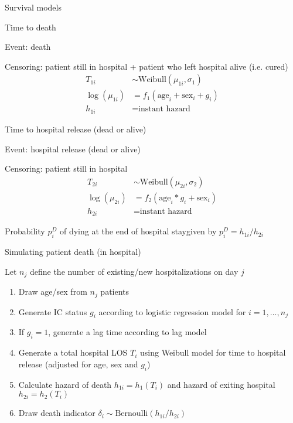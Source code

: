 \documentclass[t,9pt,xcolor=dvipsnames]{beamer}              %
\begin{document}
\begin{frame}{Survival models}
\justifying

\alert{Time to death}

Event: death

Censoring: patient still in hospital + patient who left hospital alive (i.e. cured)
\begin{align*}
T_{1i} & \sim \text{Weibull}(\mu_{1i},\sigma_{1}) \\
\log(\mu_{1i}) & = f_{1}(\text{age}_{i}+\text{sex}_{i}+g_{i}) \\
h_{1i} & = \text{instant hazard}
\end{align*}

\alert{Time to hospital release (dead or alive)}

Event: hospital release (dead or alive)

Censoring: patient still in hospital
\begin{align*}
T_{2i} & \sim \text{Weibull}(\mu_{2i},\sigma_{2}) \\
\log(\mu_{2i}) & = f_{2}(\text{age}_{i}*g_{i}+\text{sex}_{i}) \\
h_{2i} & = \text{instant hazard}
\end{align*}

Probability $p^{D}_{i}$ of dying at the end of hospital staygiven by $p^{D}_{i} = h_{1i}/h_{2i}$



\note{
\tiny
\justifying

}
\end{frame}

\begin{frame}{Simulating patient death (in hospital)}
\justifying

Let $n_{j}$ define the number of existing/new hospitalizations on day $j$
\begin{enumerate}
\item Draw age/sex from $n_{j}$ patients
\item Generate IC status $g_{i}$ according to logistic regression model for $i=1,...,n_{j}$
\item If $g_{i}=1$, generate a lag time according to lag model
\item Generate a total hospital LOS $T_{i}$ using Weibull model for time to hospital release (adjusted for age, sex and $g_{i}$)
\item Calculate hazard of death $h_{1i}=h_{1}(T_{i})$ and hazard of exiting hospital $h_{2i}=h_{2}(T_{i})$
\item Draw death indicator $\delta_{i} \sim \text{Bernoulli}(h_{1i}/h_{2i})$
\end{enumerate}


\note{
\tiny
\justifying

}
\end{frame}
\end{document}
